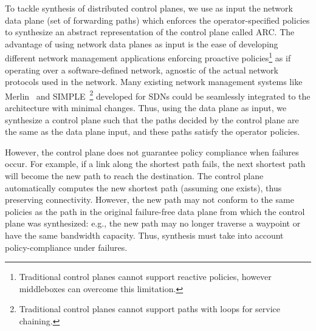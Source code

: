 To tackle synthesis 
of distributed control planes, 
we use as input the network data plane 
(set of forwarding paths)  which 
enforces the operator-specified policies to
synthesize an abstract representation of the control plane
called ARC. 
The advantage of using network data planes as 
input is the ease of developing
different network management applications 
enforcing proactive policies\footnote{
Traditional control planes cannot support reactive policies, however
middleboxes can overcome this limitation.} 
as if operating over a software-defined
network, agnostic of the actual network protocols used in the network. 
Many existing network management systems like Merlin~\cite{merlin} 
and SIMPLE~\cite{simple}\footnote{
Traditional control planes cannot support 
paths with loops for service chaining.} developed for SDNs 
could be seamlessly integrated to the architecture with minimal changes.
Thus, using the data plane as input, we synthesize a control plane
such that the paths decided by the control plane are the same 
as the data plane input, and these paths satisfy the operator 
policies.

However, the control plane does not guarantee policy compliance 
when failures occur. For
example, if a link along the shortest path 
fails,  the next shortest path will become the new path to reach the
destination. The control plane automatically computes the new shortest path
(assuming one exists), thus preserving connectivity. 
However, the new path may
not conform to the same policies as the path in the 
original failure-free data
plane from which the control plane was synthesized: 
e.g., the new path may no longer
traverse a waypoint or have the same bandwidth capacity. Thus,
synthesis must take into account policy-compliance under failures.


